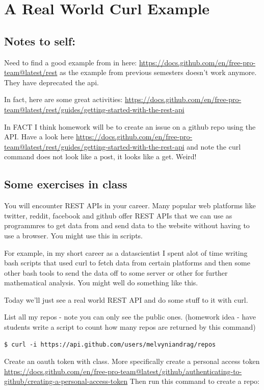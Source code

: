 \documentclass[10pt]{article}
\begin{document}
\section{A Real World Curl Example}
\subsection{Notes to self:}
Need to find a good example from in here:
\url{https://docs.github.com/en/free-pro-team@latest/rest} as the example from
previous semesters doesn't work anymore. They have deprecated the api.

In fact, here are some great activities:
\url{https://docs.github.com/en/free-pro-team@latest/rest/guides/getting-started-with-the-rest-api}

In FACT I think homework will be to create an issue on a github repo using the
API. Have a look here
\url{https://docs.github.com/en/free-pro-team@latest/rest/guides/getting-started-with-the-rest-api}
and note the curl command does not look like a post, it looks like a get. Weird!
\subsection{Some exercises in class}
You will encounter REST APIs in your career. Many popular web platforms like
twitter, reddit, facebook and github offer REST APIs that we can use as
programmres to get data from and send data to the website without having to use
a browser. You might use this in scripts. 

For example, in my short career as a datascientist I spent alot of time writing
bash scripts that used curl to fetch data from certain platforms and then some
other bash tools to send the data off to some server or other for further
mathematical analysis. You might well do something like this.

Today we'll just see a real world REST API and do some stuff to it with curl.


List all my repos - note you can only see the public ones. 
(homework idea - have students write a script to count how many repos are
returned by this command)
\begin{lstlisting}
$ curl -i https://api.github.com/users/melvyniandrag/repos
\end{lstlisting}


Create an oauth token with class.
More specifically create a personal access token
\url{https://docs.github.com/en/free-pro-team@latest/github/authenticating-to-github/creating-a-personal-access-token}
Then run this command to create a repo:
\end{document}

